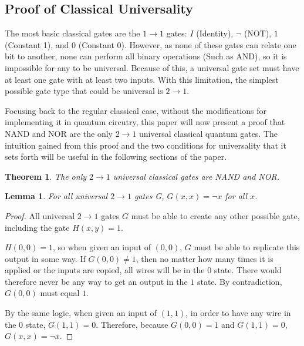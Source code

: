 \documentclass[12pt]{article}
\begin{document}
\subsection{Proof of Classical Universality}
The most basic classical gates are the $1 \to 1$ gates: $I$ (Identity),  $\neg$ (NOT), $1$ (Constant 1), and $0$ (Constant 0). However, as none of these gates can relate one bit to another, none can perform all binary operations (Such as AND), so it is impossible for any to be universal. Because of this, a universal gate set must have at least one gate with at least two inputs.
With this limitation, the simplest possible gate type that could be universal is $2 \to 1$.

Focusing back to the regular classical case, without the modifications for implementing it in quantum circutry, this paper will now present a proof that NAND and NOR are the only $2 \to 1$ universal classical quantum gates. The intuition gained from this proof and the two conditions for universality that it sets forth will be useful in the following sections of the paper.


\newtheorem{theorem}{Theorem}
\newtheorem{lemma}{Lemma}
\newtheorem{corrolary}{Corrolary}

\begin{theorem}
    The only $2 \to 1$ universal classical gates are NAND and NOR.
\end{theorem}

\begin{lemma}
    For all universal $2 \to 1$ gates G, $G(x, x) = \neg x$ for all $x$.
\end{lemma}

\begin{proof}
    All universal $2 \to 1$ gates $G$ must be able to create any other possible gate, including the gate $H(x, y) = 1$.

    $H(0, 0) = 1$, so when given an input of $(0, 0)$, $G$ must be able to replicate this output in some way. If $G(0, 0) \ne 1$, then no matter how many times it is applied or the inputs are copied, all wires will be in the $0$ state. There would therefore never be any way to get an output in the $1$ state. By contradiction, $G(0, 0)$ must equal $1$.
    
    By the same logic, when given an input of $(1, 1)$, in order to have any wire in the $0$ state, $G(1, 1) = 0$.
    Therefore, because $G(0, 0) = 1$ and $G(1, 1) = 0$, $G(x, x) = \neg x$. 
\end{proof}
\end{document}
